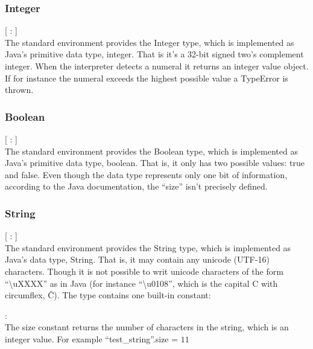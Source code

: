 \subsubsection{Integer}

\begin{dlist}
  \item {}[ : ]\\
The standard environment provides the Integer type, which is implemented as Java's primitive data type, integer. That is
it's a 32-bit signed two's complement integer. When the interpreter detects a numeral it returns an integer value object. If
for instance the numeral exceeds the highest possible value a TypeError is thrown.
\end{dlist}

\subsubsection{Boolean}

\begin{dlist}
  \item {}[ : ]\\
  The standard environment provides the Boolean type, which is implemented as Java's primitive data type, boolean. That is, it only has two possible values: true and false. Even though the data type represents only one bit of information, according to the Java documentation, the ``size'' isn't precisely defined. 
\end{dlist}

\subsubsection{String}
\begin{dlist}
  \item {}[ : ]\\
    The standard environment provides the String type, which is implemented as Java's data type, String. That is, it may contain any unicode (UTF-16) characters. Though it is not possible to writ unicode characters of the form ``\textbackslash{}uXXXX'' as in Java (for instance ``\textbackslash{}u0108'', which is the capital C with circumflex, Ĉ). The  type contains one built-in constant:  
  \begin{dlist}
  \item {} : \\
  The size constant returns the number of characters in the string, which is an integer value. For example ``test\_string''.size = $11$
  \end{dlist}
\end{dlist}
